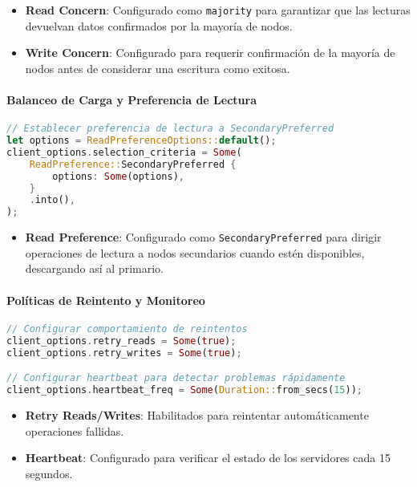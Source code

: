 \documentclass[12pt,letterpaper]{article}
\begin{document}
\begin{itemize}
    \item \textbf{Read Concern}: Configurado como \texttt{majority} para garantizar que las lecturas devuelvan datos confirmados por la mayoría de nodos.
    \item \textbf{Write Concern}: Configurado para requerir confirmación de la mayoría de nodos antes de considerar una escritura como exitosa.
\end{itemize}

\paragraph{Balanceo de Carga y Preferencia de Lectura}
\begin{lstlisting}[language=rust]
// Establecer preferencia de lectura a SecondaryPreferred
let options = ReadPreferenceOptions::default();
client_options.selection_criteria = Some(
    ReadPreference::SecondaryPreferred {
        options: Some(options),
    }
    .into(),
);
\end{lstlisting}

\begin{itemize}
    \item \textbf{Read Preference}: Configurado como \texttt{SecondaryPreferred} para dirigir operaciones de lectura a nodos secundarios cuando estén disponibles, descargando así al primario.
\end{itemize}

\paragraph{Políticas de Reintento y Monitoreo}
\begin{lstlisting}[language=rust]
// Configurar comportamiento de reintentos
client_options.retry_reads = Some(true);
client_options.retry_writes = Some(true);

// Configurar heartbeat para detectar problemas rápidamente
client_options.heartbeat_freq = Some(Duration::from_secs(15));
\end{lstlisting}

\begin{itemize}
    \item \textbf{Retry Reads/Writes}: Habilitados para reintentar automáticamente operaciones fallidas.
    \item \textbf{Heartbeat}: Configurado para verificar el estado de los servidores cada 15 segundos.
\end{itemize}
\end{document}
